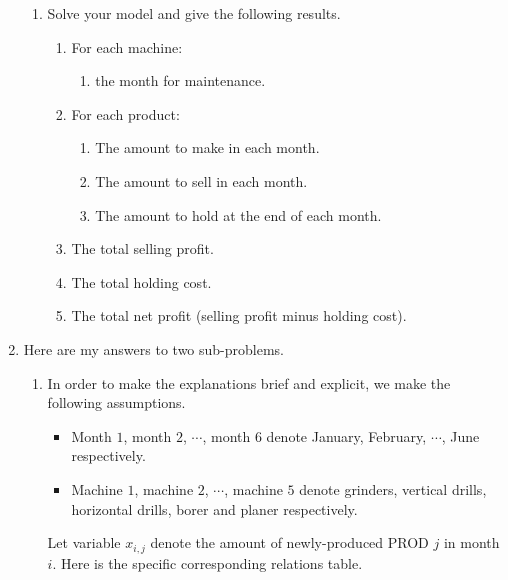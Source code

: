 \documentclass[12pt,a4paper]{article}
\makeatletter
\newtheorem*{solution}{Solution}
\theoremstyle{definition}
\renewenvironment{solution}[1][Solution] {\par\pushQED{\qed}\normalfont\topsep6\p@\@plus6\p@\relax\trivlist\item[\hskip\labelsep\bfseries#1\@addpunct{.}]\ignorespaces}{\popQED\endtrivlist\@endpefalse} \makeatother
\makeatother
\begin{document}
\begin{enumerate}
\begin{enumerate}
		\item
		Solve your model and give the following results.
		\begin{enumerate}
			\item
			For each machine:
			\begin{enumerate}
				\item
				the month for maintenance.
			\end{enumerate}
			\item
			For each product:
			\begin{enumerate}
				\item
				The amount to make in each month.
				\item
				The amount to sell in each month.
				\item
				The amount to hold at the end of each month.
			\end{enumerate}
			\item
			The total selling profit.
			\item
			The total holding cost.
			\item
			The total net profit (selling profit minus holding cost).
		\end{enumerate}
	\end{enumerate}
    \begin{solution} Here are my answers to two sub-problems.
    \begin{enumerate}
    \item In order to make the explanations brief and explicit, we make the following assumptions.
        \begin{itemize}
        \item Month $1$, month $2$, $\cdots$, month $6$ denote January, February, $\cdots$, June respectively.
        \item Machine $1$, machine $2$, $\cdots$, machine $5$ denote grinders, vertical drills, horizontal drills, borer and planer respectively.
        \end{itemize}
        Let variable $x_{i,j}$ denote the amount of newly-produced PROD $j$ in month $i$. Here is the specific corresponding relations table.
    	\begin{table}[htbp]
    		\scriptsize
    		\centering
    		\renewcommand\arraystretch{1.1}
    		\begin{tabular}{m{} m{}<{\centering} m{}<{\centering} m{}<{\centering} m{}<{\centering} m{}<{\centering} m{}<{\centering} m{}<{\centering}}

\end{tabular}
\end{table}
\end{enumerate}
\end{solution}
\end{enumerate}
\end{document}

